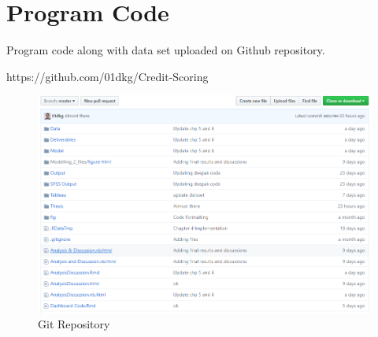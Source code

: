 %
%
%
%

\chapter{Program Code}\label{C.Appendix1}

Program code along with data set uploaded on Github repository.

https://github.com/01dkg/Credit-Scoring

\begin{center}
\begin{figure}[!htb]
\includegraphics[width=\textwidth]{git.png}
\centering
\caption{Git Repository}
\label{fig:git}
\end{figure}
\end{center}